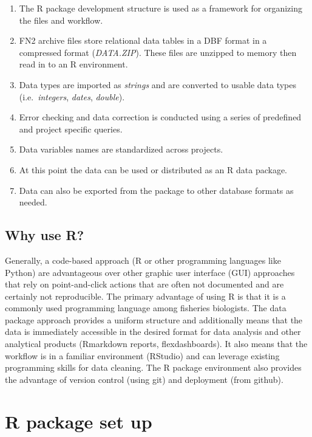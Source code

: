 \documentclass[
]{book}
\providecommand{\tightlist}{%
  \setlength{\itemsep}{0pt}\setlength{\parskip}{0pt}}
\begin{document}
\begin{enumerate}
\def\labelenumi{\arabic{enumi}.}
\tightlist
\item
  The R package development structure is used as a framework for organizing the files and workflow.
\item
  FN2 archive files store relational data tables in a DBF format in a compressed format (\emph{DATA.ZIP}). These files are unzipped to memory then read in to an R environment.\\
\item
  Data types are imported as \emph{strings} and are converted to usable data types (i.e.~\emph{integers}, \emph{dates}, \emph{double}).\\
\item
  Error checking and data correction is conducted using a series of predefined and project specific queries.\\
\item
  Data variables names are standardized across projects.\\
\item
  At this point the data can be used or distributed as an R data package.
\item
  Data can also be exported from the package to other database formats as needed.
\end{enumerate}

\hypertarget{why-use-r}{%
\section{Why use R?}\label{why-use-r}}

Generally, a code-based approach (R or other programming languages like Python) are advantageous over other graphic user interface (GUI) approaches that rely on point-and-click actions that are often not documented and are certainly not reproducible. The primary advantage of using R is that it is a commonly used programming language among fisheries biologists. The data package approach provides a uniform structure and additionally means that the data is immediately accessible in the desired format for data analysis and other analytical products (Rmarkdown reports, flexdashboards). It also means that the workflow is in a familiar environment (RStudio) and can leverage existing programming skills for data cleaning. The R package environment also provides the advantage of version control (using git) and deployment (from github).

\hypertarget{r-package-set-up}{%
\chapter{R package set up}\label{r-package-set-up}}
\end{document}
